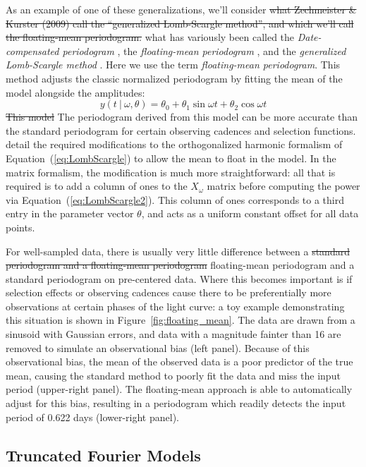 \documentclass{emulateapj}
\newcommand{\Fig}[1]{Figure~\ref{fig:#1}}
\newcommand{\fig}[1]{\Fig{#1}}
\newcommand{\Eq}[1]{Equation~(\ref{eq:#1})}
\newcommand{\eq}[1]{\Eq{#1}}
\newcommand{\sectlabel}[1]{\label{sect:#1}}
\newcommand{\new}[1]{{\color{red} #1}}
\newcommand{\old}[1]{{\sout{#1}}}
\begin{document}
As an example of one of these generalizations, we'll consider \old{what Zechmeister \& Kurster (2009) call the ``generalized Lomb-Scargle method'', and which we'll call the floating-mean periodogram.}
\new{what has variously been called the {\it Date-compensated periodogram} \citep{Ferraz-Mello81}, the {\it floating-mean periodogram} \citep{Cumming99}, and the {\it generalized Lomb-Scargle method} \citep{Zechmeister09}. Here we use the term {\it floating-mean periodogram}.} This method adjusts the classic normalized periodogram by fitting the mean of the model alongside the amplitudes:
\begin{equation}
  y(t~|~\omega, \theta) = \theta_0 + \theta_1\sin\omega t + \theta_2\cos\omega t
\end{equation}
\old{This model} \new{The periodogram derived from this model} can be more accurate than the standard periodogram for certain observing cadences and selection functions. \citet{Zechmeister09} detail the required modifications to the \new{orthogonalized} harmonic formalism of \eq{LombScargle} to allow the mean to float in the model. In the matrix formalism, the modification is much more straightforward: all that is required is to add a column of ones to the $X_\omega$ matrix before computing the power via \eq{LombScargle2}. This column of ones corresponds to a third entry in the parameter vector $\theta$, and acts as a uniform constant offset for all data points.

For well-sampled data, there is usually very little difference between a \old{standard periodogram and a floating-mean periodogram} \new{floating-mean periodogram and a standard periodogram on pre-centered data}. Where this becomes important is if selection effects or observing cadences cause there to be preferentially more observations at certain phases of the light curve: a toy example demonstrating this situation is shown in \fig{floating_mean}. The data are drawn from a sinusoid with Gaussian errors, and data with a magnitude fainter than 16 are removed to simulate an observational bias (left panel). Because of this observational bias, the mean of the observed data is a poor predictor of the true mean, causing the standard method to poorly fit the data and miss the input period (upper-right panel). The floating-mean approach is able to automatically adjust for this bias, resulting in a periodogram which readily detects the input period of 0.622 days (lower-right panel).


\subsection{Truncated Fourier Models}
\sectlabel{multiterm}
\end{document}
